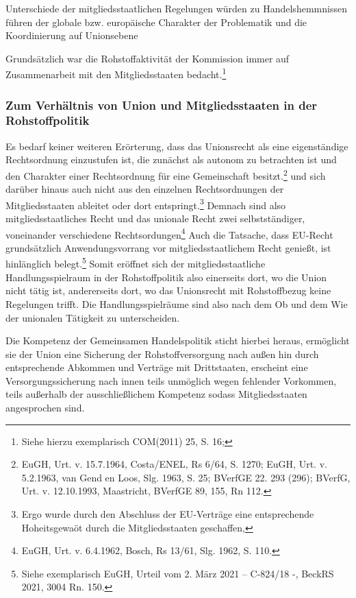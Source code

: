 \documentclass[12pt,a4paper,oneside]{book} %
\begin{document}
	Unterschiede der mitgliedsstaatlichen Regelungen würden zu Handelshemmnissen führen
	der globale bzw. europäische Charakter der Problematik und die Koordinierung auf Unionsebene
	
	
	Grundsätzlich war die Rohstoffaktivität der Kommission immer auf Zusammenarbeit mit den Mitgliedsstaaten bedacht.\footnote{Siehe hierzu exemplarisch COM(2011) 25, S. 16;}
	
	\subsubsection{Zum Verhältnis von Union und Mitgliedsstaaten in der Rohstoffpolitik}
	
	Es bedarf keiner weiteren Erörterung, dass das Unionsrecht als eine eigenständige Rechtsordnung einzustufen ist, die zunächst als autonom zu betrachten ist und den Charakter einer Rechtsordnung für eine Gemeinschaft besitzt.\footnote{EuGH, Urt. v. 15.7.1964, Costa/ENEL, Rs 6/64, S. 1270; EuGH, Urt. v. 5.2.1963, van Gend en Loos, Slg. 1963, S. 25; BVerfGE 22. 293 (296); BVerfG, Urt. v. 12.10.1993, Maastricht, BVerfGE 89, 155, Rn 112.} und sich darüber hinaus auch nicht aus den einzelnen Rechtsordnungen der Mitgliedsstaaten ableitet oder dort entspringt.\footnote{Ergo wurde durch den Abschluss der EU-Verträge eine entsprechende Hoheitsgewaöt durch die Mitgliedsstaaten geschaffen,} Demnach sind also mitgliedsstaatliches Recht und das unionale Recht \glqq zwei selbstständiger, voneinander verschiedene Rechtsordungen\grqq\footnote{EuGH, Urt. v. 6.4.1962, Bosch, Rs 13/61, Slg. 1962, S. 110.} Auch die Tatsache, dass EU-Recht grundsätzlich Anwendungsvorrang vor mitgliedsstaatlichem Recht genießt, ist hinlänglich belegt.\footnote{Siehe exemplarisch EuGH, Urteil vom 2. März 2021 – C-824/18 -, BeckRS 2021, 3004 Rn. 150.} Somit eröffnet sich der mitgliedsstaatliche Handlungsspielraum in der Rohstoffpolitik also einerseits dort, wo die Union nicht tätig ist, andererseits dort, wo das Unionsrecht mit Rohstoffbezug keine Regelungen trifft. Die Handlungsspielräume sind also nach dem Ob und dem Wie der unionalen Tätigkeit zu unterscheiden.
	
	Die Kompetenz der Gemeinsamen Handelspolitik sticht hierbei heraus, ermöglicht sie der Union eine Sicherung der Rohstoffversorgung nach außen hin durch entsprechende Abkommen und Verträge mit Drittstaaten, erscheint eine Versorgungssicherung nach innen teils unmöglich wegen fehlender Vorkommen, teils außerhalb der ausschließlichem Kompetenz sodass Mitgliedsstaaten angesprochen sind.
	
\end{document}

